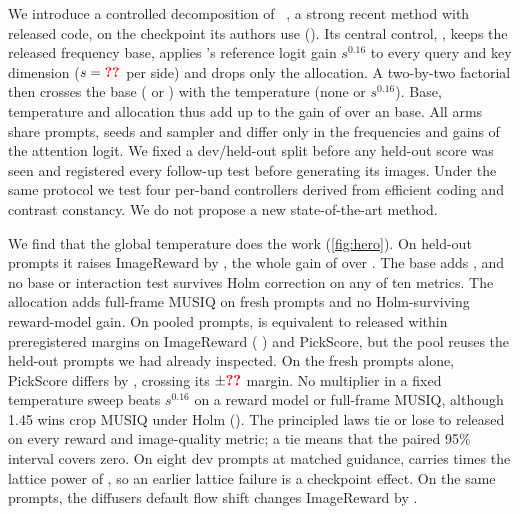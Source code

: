 We introduce a controlled decomposition of \sega~\citep{sega2026}, a strong recent method with released code, on the checkpoint its authors use (\krea). Its central control, \tempsb, keeps the released frequency base, applies \sega's reference logit gain $s^{0.16}$ to every query and key dimension ($s=\N{c@s}$ per side) and drops only the allocation. A two-by-two factorial then crosses the base (\ntk{} or \sega) with the temperature (none or $s^{0.16}$). Base, temperature and allocation thus add up to the gain of \sega{} over an \ntk{} base. All arms share prompts, seeds and sampler and differ only in the frequencies and gains of the attention logit. We fixed a dev/held-out split before any held-out score was seen and registered every follow-up test before generating its images. Under the same protocol we test four per-band controllers derived from efficient coding and contrast constancy. We do not propose a new state-of-the-art method.

We find that the global temperature does the work (\cref{fig:hero}). On  held-out prompts it raises ImageReward by  , the whole  gain of \sega{} over \ntk. The \sega{} base adds  , and no base or interaction test survives Holm correction on any of ten metrics. The allocation adds   full-frame MUSIQ on  fresh prompts and no Holm-surviving reward-model gain. On  pooled prompts, \tempsb{} is equivalent to released \sega{} within preregistered margins on ImageReward ( ) and PickScore, but the pool reuses the  held-out prompts we had already inspected. On the fresh prompts alone, PickScore differs by  , crossing its $\pm\N{st@h@m@pick}$ margin. No multiplier in a fixed temperature sweep beats $s^{0.16}$ on a reward model or full-frame MUSIQ, although 1.45 wins crop MUSIQ under Holm (). The principled laws tie or lose to released \sega{} on every reward and image-quality metric; a tie means that the paired 95\% interval covers zero. On eight dev prompts at matched guidance, \fluxdev{} carries  times  the lattice power of \krea, so an earlier lattice failure is a checkpoint effect. On the same prompts, the diffusers default flow shift changes ImageReward by  .

